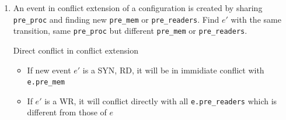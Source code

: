 \documentclass{llncs}
\begin{document}
\begin{enumerate}
		\begin{algorithm}{}
			Given two events $e$ and $e'$ in the enable set of configuration C, 
			do as follows to check the direct (immediate) conflict between them:
			\begin{enumerate}
				\item
					Set pr1 = e.pre\_proc
				\item
					If \verb!e.trans.type ==  WR!
				\item
					If \verb!e.trans.type == RD!
					\begin{itemize}
						\item
							If one of two is a LOC, there is no direct conflict between them because of the 								deterministic feature of the system.
						\item
							If they are two RDs: \verb!e'.pre_readers[i] = e.pre_mem!
					\end{itemize}
			\end{enumerate}
			\noindent
			\caption{Check direct conflict between two enabled events}
			\label{a:dicfl}
		\end{algorithm}

	\item
		An event in conflict extension of a configuration is created by sharing \verb!pre_proc! and finding
		new \verb!pre_mem! or \verb!pre_readers!.
		Find $e'$ with the same transition, same \verb!pre_proc! but different \verb!pre_mem! or
		\verb!pre_readers!.
		\begin{lemma}{Direct conflict in conflict extension}
			\begin{itemize}
				\item
					If new event $e'$ is a SYN, RD, it will be in immidiate conflict with \verb!e.pre_mem!
				\item
					If $e'$ is a WR, it will conflict directly with all \verb!e.pre_readers! which is
					different from those of $e$
			\end{itemize}
		\end{lemma}
		
\end{enumerate}
\end{document}

